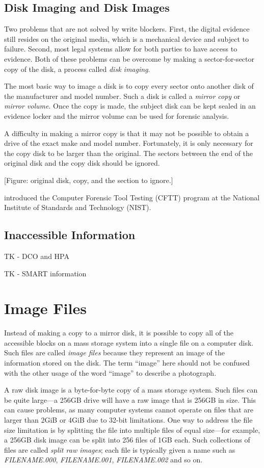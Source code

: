 \subsection{Disk Imaging and Disk Images}
Two problems that are not solved by write blockers. First, the
digital evidence still resides on the original media, which is a
mechanical device and subject to failure. Second, most legal systems
allow for both parties to have access to evidence. Both of these
problems can be overcome by making a sector-for-sector copy of the
disk, a process called \emph{disk imaging}.

The most basic way to image a disk is to copy every sector onto
another disk of the manufacturer and model number. Such a disk is
called a \emph{mirror copy} or \emph{mirror volume}. Once the copy is made, the subject disk
can be kept sealed in an evidence locker and the mirror volume can be
used for forensic analysis. 

A difficulty in making a mirror copy is that it may not be possible to
obtain a drive of the exact make and model number. Fortunately, it is
only necessary for the copy disk to be larger than the original. The
sectors between the end of the original disk and the copy disk should
be ignored.

[Figure: original disk, copy, and the section to ignore.]

 introduced the Computer Forensic Tool Testing (CFTT)
program at the National Institute of Standards and Technology (NIST).

\subsection{Inaccessible Information}

TK - DCO and HPA

TK - SMART information

\section{Image Files}
Instead of making a copy to a mirror disk, it is possible to copy all
of the accessible blocks on a mass storage system into a single file
on a computer disk. Such files are called \emph{image files} because
they represent an image of the information stored on the disk. The
term ``image'' here should not be confused with the other usage of the
word ``image'' to describe a photograph.

A raw disk image is a byte-for-byte copy of a mass storage
system. Such files can be quite large---a 256GB drive will have a raw
image that is 256GB in size. This can cause problems, as many computer
systems cannot operate on files that are larger than 2GiB or 4GiB due
to 32-bit limitations. One way to address the file size limitation is
by splitting the file into multiple files of equal size---for example,
a 256GB disk image can be split into 256 files of 1GB each. Such
collections of files are called \emph{split raw images}; each file is
typically given a name such as \emph{FILENAME.000}, \emph{FILENAME.001},
\emph{FILENAME.002} and so on.

